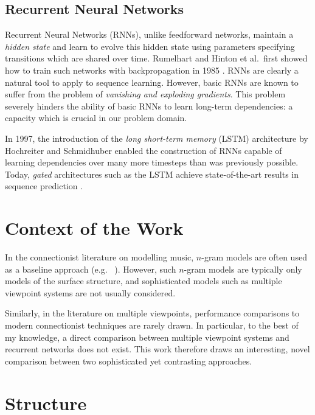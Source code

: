 \documentclass[12pt,a4paper,twoside,openright]{report}
\begin{document}
\subsection{Recurrent Neural Networks}

Recurrent Neural Networks (RNNs), unlike feedforward networks, maintain a
\emph{hidden state} and learn to evolve this hidden state using parameters
specifying transitions which are shared over time. Rumelhart and Hinton et al.\
first showed how to train such networks with backpropagation in 1985
\cite{rumelhart1985learning}. RNNs are clearly a natural tool to apply to
sequence learning. However, basic RNNs are known to suffer from the problem of
\emph{vanishing and exploding gradients}. This problem severely hinders the
ability of basic RNNs to learn long-term dependencies: a capacity which is
crucial in our problem domain.

In 1997, the introduction of the \emph{long short-term memory} (LSTM)
architecture by Hochreiter and Schmidhuber \cite{hochreiter1997long} enabled the
construction of RNNs capable of learning dependencies over many more timesteps
than was previously possible. Today, \emph{gated} architectures such as the LSTM
achieve state-of-the-art results in sequence prediction \cite{zaremba2014recurrent}.

\section{Context of the Work}\label{sec:context-of-work}

In the connectionist literature on modelling music, $n$-gram models are often
used as a baseline approach (e.g.\ \cite{boulanger2012modeling}
\cite{liang2016bachbot}). However, such $n$-gram models are typically only
models of the surface structure, and sophisticated models such as multiple
viewpoint systems are not usually considered.

Similarly, in the literature on multiple viewpoints, performance comparisons to
modern connectionist techniques are rarely drawn. In particular, to the best of
my knowledge, a direct comparison between multiple viewpoint systems and
recurrent networks does not exist. This work therefore draws an interesting, 
novel comparison between two sophisticated yet contrasting approaches.

\section{Structure}
\end{document}
